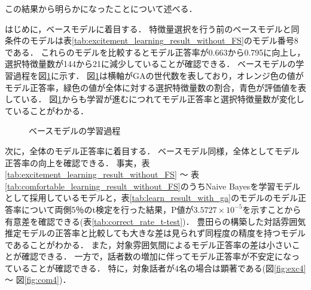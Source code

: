 この結果から明らかになったことについて述べる．

はじめに，ベースモデルに着目する．
特徴量選択を行う前のベースモデルと同条件のモデルは表\ref{tab:excitement_learning_result_without_FS}のモデル番号8である．
これらのモデルを比較するとモデル正答率が0.663から0.795に向上し，選択特徴量数が144から21に減少していることが確認できる．
ベースモデルの学習過程を図\ref{fig:exc3_crossover}に示す．
図\ref{fig:exc3_crossover}は横軸がGAの世代数を表しており，オレンジ色の値がモデル正答率，緑色の値が全体に対する選択特徴量数の割合，青色が評価値を表している．
図\ref{fig:exc3_crossover}からも学習が進むにつれてモデル正答率と選択特徴量数が変化していることがわかる．

\begin{figure}
    \centering
    \caption{ベースモデルの学習過程}
    \label{fig:exc3_crossover}
\end{figure}

次に，全体のモデル正答率に着目する．
ベースモデル同様，全体としてモデル正答率の向上を確認できる．
事実，表\ref{tab:excitement_learning_result_without_FS} 〜 表\ref{tab:comfortable_learning_result_without_FS}のうちNaive Bayesを学習モデルとして採用しているモデルと，表\ref{tab:learn_result_with_ga}のモデルのモデル正答率について両側5％のt検定を行った結果，P値が$3.5727 \times 10^{-5}$を示すことから有意差を確認できる(表\ref{tab:correct_rate_t-test})．
豊田らの構築した対話雰囲気推定モデルの正答率と比較しても大きな差は見られず同程度の精度を持つモデルであることがわかる．
また，対象雰囲気間によるモデル正答率の差は小さいことが確認できる．
一方で，話者数の増加に伴ってモデル正答率が不安定になっていることが確認できる．
特に，対象話者が4名の場合は顕著である(図\ref{fig:exc4} 〜 図\ref{fig:com4})．

